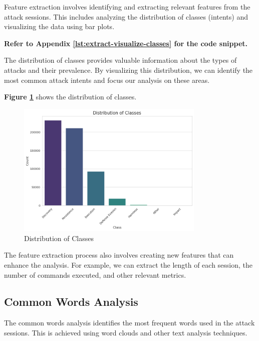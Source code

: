        Feature extraction involves identifying and extracting relevant features from the attack sessions. This includes analyzing the distribution of classes (intents) and visualizing the data using bar plots.
            
        \textbf{Refer to Appendix \ref{lst:extract-visualize-classes} for the code snippet.}

        The distribution of classes provides valuable information about the types of attacks and their prevalence. By visualizing this distribution, we can identify the most common attack intents and focus our analysis on these areas.

        \textbf{Figure \ref{fig:class-distribution}} shows the distribution of classes.

        \begin{figure}[h]
            \centering
            \includegraphics[width=0.8\textwidth]{../figures/plots/section1/distribution_of_classes.png}
            \caption{Distribution of Classes}
            \label{fig:class-distribution}
        \end{figure}

        The feature extraction process also involves creating new features that can enhance the analysis. For example, we can extract the length of each session, the number of commands executed, and other relevant metrics.

    \subsection{Common Words Analysis}
    
        The common words analysis identifies the most frequent words used in the attack sessions. This is achieved using word clouds and other text analysis techniques.
            
